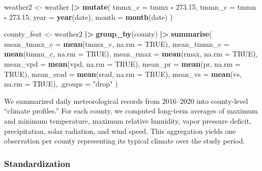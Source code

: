 \documentclass[
]{article}
\newenvironment{Shaded}{\begin{snugshade}}{\end{snugshade}}
\newcommand{\AttributeTok}[1]{\textcolor[rgb]{0.13,0.29,0.53}{#1}}
\newcommand{\ConstantTok}[1]{\textcolor[rgb]{0.56,0.35,0.01}{#1}}
\newcommand{\FloatTok}[1]{\textcolor[rgb]{0.00,0.00,0.81}{#1}}
\newcommand{\FunctionTok}[1]{\textcolor[rgb]{0.13,0.29,0.53}{\textbf{#1}}}
\newcommand{\NormalTok}[1]{#1}
\newcommand{\OtherTok}[1]{\textcolor[rgb]{0.56,0.35,0.01}{#1}}
\newcommand{\SpecialCharTok}[1]{\textcolor[rgb]{0.81,0.36,0.00}{\textbf{#1}}}
\newcommand{\StringTok}[1]{\textcolor[rgb]{0.31,0.60,0.02}{#1}}
\begin{document}
\begin{Shaded}
\begin{Highlighting}[]
\NormalTok{weather2 }\OtherTok{\textless{}{-}}\NormalTok{ weather }\SpecialCharTok{|\textgreater{}}
\FunctionTok{mutate}\NormalTok{(}
\AttributeTok{tmmx\_c =}\NormalTok{ tmmx }\SpecialCharTok{{-}} \FloatTok{273.15}\NormalTok{,}
\AttributeTok{tmmn\_c =}\NormalTok{ tmmn }\SpecialCharTok{{-}} \FloatTok{273.15}\NormalTok{,}
\AttributeTok{year   =} \FunctionTok{year}\NormalTok{(date),}
\AttributeTok{month  =} \FunctionTok{month}\NormalTok{(date)}
\NormalTok{)}

\NormalTok{county\_feat }\OtherTok{\textless{}{-}}\NormalTok{ weather2 }\SpecialCharTok{|\textgreater{}}
\FunctionTok{group\_by}\NormalTok{(county) }\SpecialCharTok{|\textgreater{}}
\FunctionTok{summarise}\NormalTok{(}
\AttributeTok{mean\_tmmx\_c =} \FunctionTok{mean}\NormalTok{(tmmx\_c, }\AttributeTok{na.rm =} \ConstantTok{TRUE}\NormalTok{),}
\AttributeTok{mean\_tmmn\_c =} \FunctionTok{mean}\NormalTok{(tmmn\_c, }\AttributeTok{na.rm =} \ConstantTok{TRUE}\NormalTok{),}
\AttributeTok{mean\_rmax   =} \FunctionTok{mean}\NormalTok{(rmax,   }\AttributeTok{na.rm =} \ConstantTok{TRUE}\NormalTok{),}
\AttributeTok{mean\_vpd    =} \FunctionTok{mean}\NormalTok{(vpd,    }\AttributeTok{na.rm =} \ConstantTok{TRUE}\NormalTok{),}
\AttributeTok{mean\_pr     =} \FunctionTok{mean}\NormalTok{(pr,     }\AttributeTok{na.rm =} \ConstantTok{TRUE}\NormalTok{),}
\AttributeTok{mean\_srad   =} \FunctionTok{mean}\NormalTok{(srad,   }\AttributeTok{na.rm =} \ConstantTok{TRUE}\NormalTok{),}
\AttributeTok{mean\_vs     =} \FunctionTok{mean}\NormalTok{(vs,     }\AttributeTok{na.rm =} \ConstantTok{TRUE}\NormalTok{),}
\AttributeTok{.groups =} \StringTok{"drop"}
\NormalTok{)}
\end{Highlighting}
\end{Shaded}

We summarized daily meteorological records from 2016--2020 into
county-level ``climate profiles.'' For each county, we computed
long-term averages of maximum and minimum temperature, maximum relative
humidity, vapor pressure deficit, precipitation, solar radiation, and
wind speed. This aggregation yields one observation per county
representing its typical climate over the study period.

\subsubsection{Standardization}\label{standardization}
\end{document}
